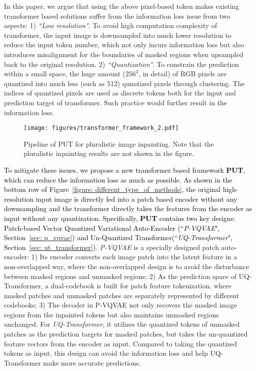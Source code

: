 \documentclass[10pt,twocolumn,letterpaper]{article}
\newcommand{\Fref}[1]{Figure~\ref{#1}}
\newcommand{\Sref}[1]{Section~\ref{#1}}
\newcommand{\qchu}[1]{\textcolor{black}{#1}}
\begin{document}
    
    In this paper, we argue that using the above pixel-based token makes existing transformer based solutions suffer from the information loss issue from two aspects: 1) \emph{``Low resolution"}. To avoid high computation complexity of transformer, the input image is downsampled into much lower resolution to reduce the input token number, which not only incurs information loss but also introduces misalignment for the boundaries of masked regions when upsampled back to the original resolution. 
    2) \emph{``Quantization"}. To constrain the prediction within a small space, the huge amount ($256^3$, in detail) of RGB pixels are quantized into much less (such as 512) qunatized pixels through clustering. The indices of quantized pixels are used as discrete tokens both for the input and prediction target of transformer. Such practice would further result in the information loss.

 \begin{figure}[t]
	\centering
	\texttt{[image: figures/transformer\_framework\_2.pdf]} 
	\caption{Pipeline of PUT for pluralistic image inpainting. 
	Note that the pluralistic inpainting results are not shown in the figure.
	}
	\vspace{-8pt}
	\label{figure: transformer_framework}
\end{figure}



    \qchu{To mitigate these issues, we propose a new transformer based framework \textbf{PUT}, which can reduce the information loss as much as possible. As shown in the bottom row of \Fref{figure: different_type_of_methods}, the original high-resolution input image is directly fed into a patch based encoder without any downsampling and the transformer directly takes the features from the encoder as input without any quantization. Specifically, \textbf{PUT} contains two key designs: Patch-based Vector Quantized Variational Auto-Encoder (``\textit{P-VQVAE}", \Sref{sec: p_vqvae}) and Un-Quantized Transformer(``\textit{UQ-Transformer}", \Sref{sec: ut_transformer}).} 
    \textit{P-VQVAE} is a specially designed patch auto-encoder: 1) Its encoder converts each image patch into the latent feature in a non-overlapped way, where the non-overlapped design is to avoid the disturbance between masked regions and unmasked regions; 2) As the prediction space of UQ-Transformer, a dual-codebook is built for patch feature tokenization, where masked patches and unmasked patches are separately represented by different codebooks;
    3) The decoder in P-VQVAE not only recovers the masked image regions from the inpainted tokens but also maintains unmasked regions unchanged. For \textit{UQ-Transformer}, it utilizes the quantized tokens of unmasked patches as the prediction targets for masked patches, but takes the un-quantized feature vectors from the encoder as input. Compared to taking the quantized tokens as input, this design can avoid the information loss and help UQ-Transformer make more accurate predictions.
    
\end{document}

